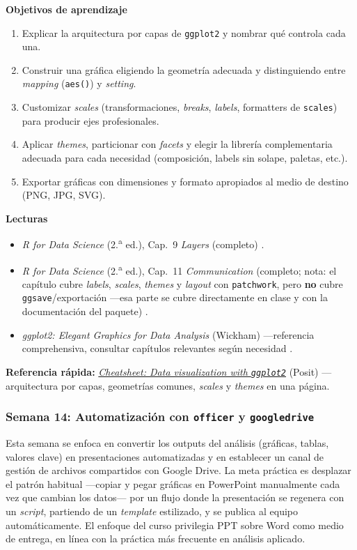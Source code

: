 \documentclass[11pt,letterpaper]{article}
\newcommand{\blue}[1]{{\color{cerulean}#1}}
\newcommand{\semana}[2]{%
  \subsubsection*{\color{main}Semana #1: #2}%
}
\newcommand{\cheatsheet}[2]{%
  \href{https://rstudio.github.io/cheatsheets/#1.pdf}{\textit{Cheatsheet: #2}}%
}
\begin{document}
\medskip
\noindent\textbf{Objetivos de aprendizaje}
\begin{enumerate}[leftmargin=*, itemsep=1pt]
    \item Explicar la arquitectura por capas de \texttt{ggplot2} y nombrar qué controla cada una.
    \item Construir una gráfica eligiendo la geometría adecuada y distinguiendo entre \textit{mapping} (\texttt{aes()}) y \textit{setting}.
    \item Customizar \textit{scales} (transformaciones, \textit{breaks}, \textit{labels}, formatters de \texttt{scales}) para producir ejes profesionales.
    \item Aplicar \textit{themes}, particionar con \textit{facets} y elegir la librería complementaria adecuada para cada necesidad (composición, labels sin solape, paletas, etc.).
    \item Exportar gráficas con dimensiones y formato apropiados al medio de destino (PNG, JPG, SVG).
\end{enumerate}

\medskip
\noindent\textbf{Lecturas}
\begin{itemize}[leftmargin=*, itemsep=1pt]
    \item \textit{R for Data Science} (2.\textsuperscript{a} ed.), Cap.\ 9 \textit{Layers} (completo) \cite{wickham2023r4ds}.
    \item \textit{R for Data Science} (2.\textsuperscript{a} ed.), Cap.\ 11 \textit{Communication} (completo; nota: el capítulo cubre \textit{labels}, \textit{scales}, \textit{themes} y \textit{layout} con \texttt{patchwork}, pero \textbf{no} cubre \texttt{ggsave}/exportación ---esa parte se cubre directamente en clase y con la documentación del paquete) \cite{wickham2023r4ds}.
    \item \textit{ggplot2: Elegant Graphics for Data Analysis} (Wickham) ---referencia comprehensiva, consultar capítulos relevantes según necesidad \cite{wickham2016ggplot2}.
\end{itemize}

\medskip
\noindent\textbf{Referencia rápida:} \cheatsheet{data-visualization}{Data visualization with \texttt{ggplot2}} (Posit) ---arquitectura por capas, geometrías comunes, \textit{scales} y \textit{themes} en una página.

\semana{14}{Automatización con \texttt{officer} y \texttt{googledrive}}

Esta semana se enfoca en convertir los outputs del análisis (gráficas, tablas, valores clave) en \blue{presentaciones automatizadas} y en establecer un canal de \blue{gestión de archivos compartidos} con Google Drive. La meta práctica es desplazar el patrón habitual ---copiar y pegar gráficas en PowerPoint manualmente cada vez que cambian los datos--- por un flujo donde la presentación se regenera con un \textit{script}, partiendo de un \textit{template} estilizado, y se publica al equipo automáticamente. El enfoque del curso privilegia PPT sobre Word como medio de entrega, en línea con la práctica más frecuente en análisis aplicado.
\end{document}
